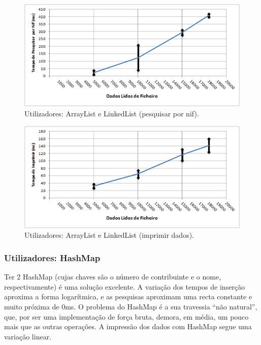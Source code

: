 \documentclass[a5paper,twocolumn, 11pt]{article}
\begin{document}
\begin{figure}[h!b!t!]
    \caption[Utilizadores: ArrayList e Linked List (pesquisar por nif)]{Utilizadores: ArrayList e LinkedList (pesquisar por nif).}
    \label{hashtable}
    \centering
        \includegraphics[width=400pt]{user_c2_o4.png}
\end{figure}
\begin{figure}[h!b!t!]
    \caption[Utilizadores: ArrayList e Linked List (imprimir dados)]{Utilizadores: ArrayList e LinkedList (imprimir dados).}
    \label{hashtable}
    \centering
        \includegraphics[width=400pt]{user_c2_o5.png}
\end{figure}

\newpage
\twocolumn
\subsubsection{Utilizadores: HashMap}
Ter 2 HashMap (cujas chaves são o número de contribuinte e o nome, respectivamente) é uma solução excelente.
A variação dos tempos de inserção aproxima a forma logarítmica, e as pesquisas aproximam uma recta constante e muito próxima de 0ms.
O problema do HashMap é a sua travessia ``não natural'', que, por ser uma implementação de força bruta, demora, em média, um pouco mais que as outras operações. A impressão dos dados com HashMap segue uma variação linear.
\end{document}
